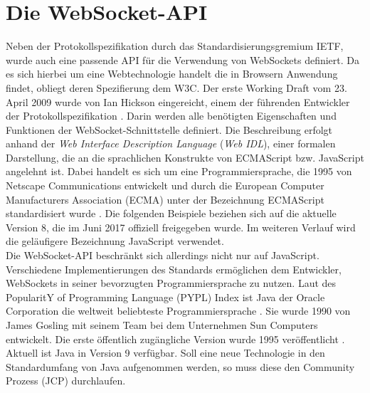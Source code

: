 \documentclass[11pt,a4paper,titlepage]{scrartcl}
\numberwithin{equation}{section}
\begin{document}
\section{Die WebSocket-API}\label{sec:WebSocketAPI}
Neben der Protokollspezifikation durch das Standardisierungsgremium IETF, wurde auch eine passende API für die Verwendung von WebSockets definiert. Da es sich hierbei um eine Webtechnologie handelt die in Browsern Anwendung findet, obliegt deren Spezifierung dem W3C. Der erste Working Draft vom 23. April 2009 wurde von Ian Hickson eingereicht, einem der führenden Entwickler der Protokollspezifikation \autocite{hickson_web_2009}. Darin werden alle benötigten Eigenschaften und Funktionen der WebSocket-Schnittstelle definiert. Die Beschreibung erfolgt anhand der \textit{Web Interface Description Language} (\textit{Web IDL}), einer formalen Darstellung, die an die sprachlichen Konstrukte von ECMAScript bzw. JavaScript angelehnt ist. Dabei handelt es sich um eine Programmiersprache, die 1995 von Netscape Communications entwickelt und durch die European Computer Manufacturers Association (ECMA) unter der Bezeichnung ECMAScript standardisiert wurde \autocite{peyrott_brief_2017}. Die folgenden Beispiele beziehen sich auf die aktuelle Version 8, die im Juni 2017 offiziell freigegeben wurde. Im weiteren Verlauf wird die geläufigere Bezeichnung JavaScript verwendet.\\

\noindent Die WebSocket-API beschränkt sich allerdings nicht nur auf JavaScript. Verschiedene Implementierungen des Standards ermöglichen dem Entwickler, WebSockets in seiner bevorzugten Programmiersprache zu nutzen. Laut des PopularitY of Programming Language (PYPL) Index ist Java der Oracle Corporation die weltweit beliebteste Programmiersprache \autocite{cabonnelle_pypl_2017}. Sie wurde 1990 von James Gosling mit seinem Team bei dem Unternehmen Sun Computers entwickelt. Die erste öffentlich zugängliche Version wurde 1995 veröffentlicht \autocite{smyth_brief_2009}. Aktuell ist Java in Version 9 verfügbar. Soll eine neue Technologie in den Standardumfang von Java aufgenommen werden, so muss diese den Community Prozess (JCP) durchlaufen. \\

\end{document}
